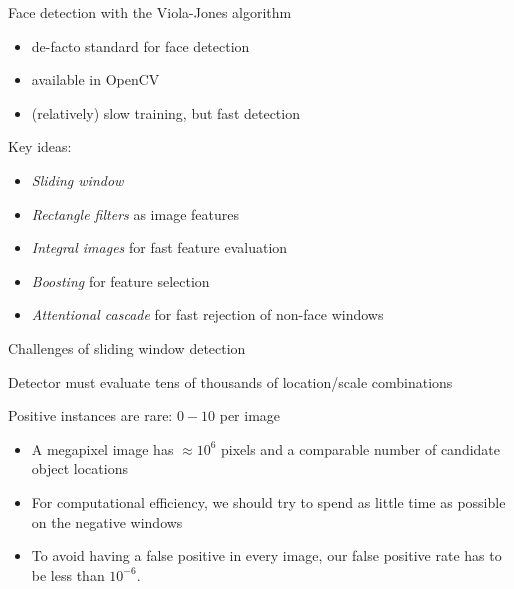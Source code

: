 \documentclass[compress]{beamer}
\begin{document}
{

\begin{frame}{Face detection with the Viola-Jones algorithm}

    \begin{itemize}
        \item de-facto standard for face detection
        \item available in OpenCV
        \item (relatively) slow training, but fast detection
    \end{itemize}

    \pause

    Key ideas:

    \begin{itemize}
        \item \emph{Sliding window}
        \item \emph{Rectangle filters} as image features
        \item \emph{Integral images} for fast feature evaluation
        \item \emph{Boosting} for feature selection
        \item \emph{Attentional cascade} for fast rejection of non-face windows
    \end{itemize}


\end{frame}
}


\begin{frame}{Challenges of sliding window detection}

Detector must evaluate tens of thousands of location/scale combinations

Positive instances are rare: $0-10$ per image

    \begin{itemize}

        \item A megapixel image has $\approx 10^6$ pixels and a comparable
            number of candidate object locations

        \item For computational efficiency, we should try to spend as little time as
            possible on the negative windows

        \item  To avoid having a false positive in every image, our false positive
            rate has to be less than $10^{-6}$.

    \end{itemize}

\end{frame}
\end{document}
